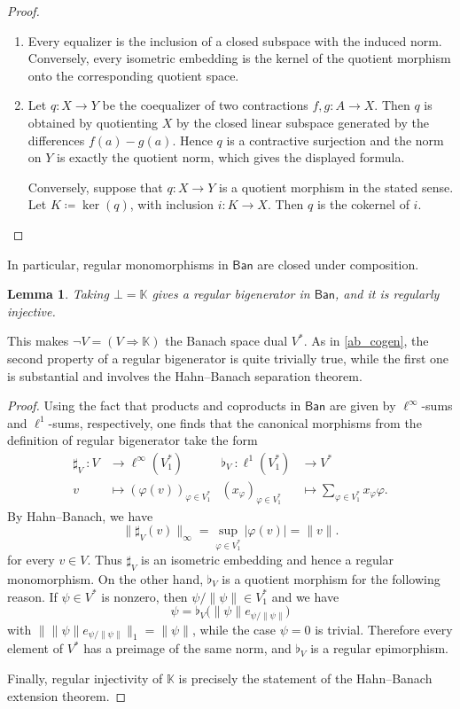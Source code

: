\documentclass[11pt,onecolumn]{article}
\newcommand{\K}{\mathbb{K}}
\newcommand{\Ban}{\mathsf{Ban}}
\theoremstyle{plain}
\newtheorem{lem}[lem]{Lemma}
\theoremstyle{remark}
\theoremstyle{definition}
\begin{document}
\begin{proof}
	\begin{enumerate}
		\item Every equalizer is the inclusion of a closed subspace with the induced norm.
			Conversely, every isometric embedding is the kernel of the quotient morphism onto the corresponding quotient space.
		\item Let $q \colon X \to Y$ be the coequalizer of two contractions $f,g \colon A \to X$.
			Then $q$ is obtained by quotienting $X$ by the closed linear subspace generated by the differences $f(a)-g(a)$.
			Hence $q$ is a contractive surjection and the norm on $Y$ is exactly the quotient norm, which gives the displayed formula.

			Conversely, suppose that $q \colon X \to Y$ is a quotient morphism in the stated sense.
			Let $K \coloneqq \ker(q)$, with inclusion $i \colon K \to X$.
			Then $q$ is the cokernel of $i$.
			\qedhere
	\end{enumerate}
\end{proof}

In particular, regular monomorphisms in $\Ban$ are closed under composition.

\begin{lem}
	Taking $\bot = \K$ gives a regular bigenerator in $\Ban$, and it is regularly injective.
\end{lem}

This makes $\neg V = (V \Rightarrow \K)$ the Banach space dual $V^*$.
As in \cref{ab_cogen}, the second property of a regular bigenerator is quite trivially true, while the first one is substantial and involves the Hahn--Banach separation theorem.

\begin{proof}
	Using the fact that products and coproducts in $\Ban$ are given by $\ell^\infty$-sums and $\ell^1$-sums, respectively,
	one finds that the canonical morphisms from the definition of regular bigenerator take the form
	\begin{align*}
		\sharp_V \: \colon V & \longrightarrow \ell^\infty(V^*_1) & \flat_V \: \colon \ell^1(V^*_1) & \longrightarrow V^* \\
		v & \longmapsto (\varphi(v))_{\varphi \in V^*_1} & (x_\varphi)_{\varphi \in V^*_1} & \longmapsto \sum_{\varphi \in V^*_1} x_\varphi \varphi.
	\end{align*}
	By Hahn--Banach, we have
	\[
		\|\sharp_V(v)\|_\infty = \sup_{\varphi \in V^*_1} |\varphi(v)| = \|v\|.
	\]
	for every $v \in V$.
	Thus $\sharp_V$ is an isometric embedding and hence a regular monomorphism.
	On the other hand, $\flat_V$ is a quotient morphism for the following reason.
	If $\psi \in V^*$ is nonzero, then $\psi/\|\psi\| \in V^*_1$ and we have
	\[
		\psi = \flat_V\bigl(\|\psi\| e_{\psi/\|\psi\|}\bigr)
	\]
	with $\|\|\psi\| e_{\psi/\|\psi\|}\|_1 = \|\psi\|$, while the case $\psi=0$ is trivial.
	Therefore every element of $V^*$ has a preimage of the same norm, and $\flat_V$ is a regular epimorphism.

	Finally, regular injectivity of $\K$ is precisely the statement of the Hahn--Banach extension theorem.
\end{proof}
\end{document}
